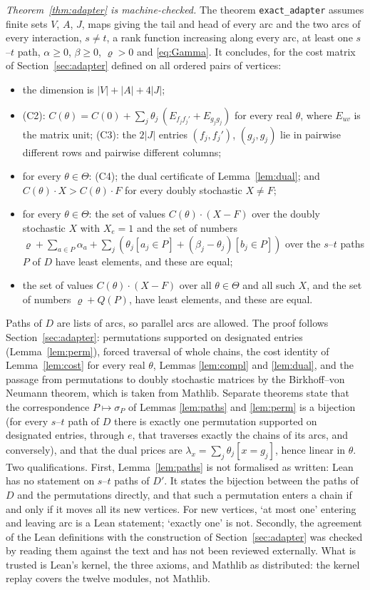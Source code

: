 \documentclass[11pt]{amsart}
\theoremstyle{plain}
\theoremstyle{definition}
\theoremstyle{remark}
\newcommand{\code}[1]{\texttt{#1}}
\begin{document}
\emph{Theorem~\ref{thm:adapter} is machine-checked.} The theorem \code{exact\_adapter} assumes finite sets $V$,
$A$, $J$, maps giving the tail and head of every arc and the two arcs of every interaction, $s\ne t$, a rank
function increasing along every arc, at least one $s$--$t$ path, $\alpha\ge0$, $\beta\ge0$, $\varrho>0$ and
\eqref{eq:Gamma}. It concludes, for the cost matrix of Section~\ref{sec:adapter} defined on all ordered pairs of
vertices:
\begin{itemize}
\item the dimension is $|V|+|A|+4|J|$;
\item \textup{(C2)}: $C(\theta)=C(0)+\sum_j\theta_j\,(E_{f_jf_j'}+E_{g_jg_j})$ for every real $\theta$, where $E_{uv}$
  is the matrix unit; \textup{(C3)}: the $2|J|$ entries $(f_j,f_j')$, $(g_j,g_j)$ lie in pairwise different rows and
  pairwise different columns;
\item for every $\theta\in\Theta$: \textup{(C4)}; the dual certificate of Lemma~\ref{lem:dual}; and
  $C(\theta)\cdot X>C(\theta)\cdot F$ for every doubly stochastic $X\ne F$;
\item for every $\theta\in\Theta$: the set of values $C(\theta)\cdot(X-F)$ over the doubly stochastic $X$ with $X_e=1$
  and the set of numbers $\varrho+\sum_{a\in P}\alpha_a+\sum_j(\theta_j[a_j\in P]+(\beta_j-\theta_j)[b_j\in P])$ over the
  $s$--$t$ paths $P$ of $D$ have least elements, and these are equal;
\item the set of values $C(\theta)\cdot(X-F)$ over all $\theta\in\Theta$ and all such $X$, and the set of numbers
  $\varrho+Q(P)$, have least elements, and these are equal.
\end{itemize}
Paths of $D$ are lists of arcs, so parallel arcs are allowed. The proof follows Section~\ref{sec:adapter}:
permutations supported on designated entries (Lemma~\ref{lem:perm}), forced traversal of whole chains, the cost
identity of Lemma~\ref{lem:cost} for every real $\theta$, Lemmas \ref{lem:compl} and \ref{lem:dual}, and the
passage from permutations to doubly stochastic matrices by the Birkhoff--von Neumann theorem, which is taken from
Mathlib. Separate theorems state that the correspondence $P\mapsto\sigma_P$ of Lemmas \ref{lem:paths} and
\ref{lem:perm} is a bijection (for every $s$--$t$ path of $D$ there is exactly one permutation supported on
designated entries, through $e$, that traverses exactly the chains of its arcs, and conversely), and that the dual
prices are $\lambda_x=\sum_j\theta_j[x=g_j]$, hence linear in $\theta$. Two qualifications. First,
Lemma~\ref{lem:paths} is not formalised as written: Lean has no statement on $s$--$t$ paths of $D'$. It states the
bijection between the paths of $D$ and the permutations directly, and that such a permutation enters a chain if
and only if it moves all its new vertices. For new vertices, `at most one' entering and leaving arc is a Lean
statement; `exactly one' is not. Secondly, the agreement of the Lean definitions with the construction of
Section~\ref{sec:adapter} was checked by reading them against the text and has not been reviewed externally. What
is trusted is Lean's kernel, the three axioms, and Mathlib as distributed: the kernel replay covers the twelve
modules, not Mathlib.
\end{document}

